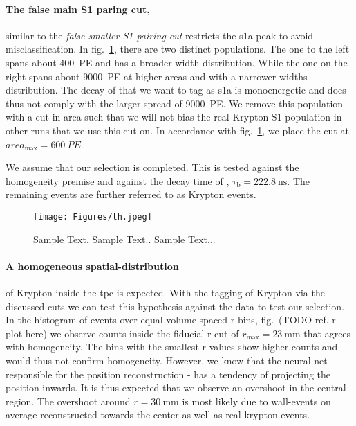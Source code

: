\paragraph{The false main S1 paring cut,} similar to the \emph{false smaller S1 pairing cut} restricts the \gls{s1a} peak to avoid misclassification.
In fig.~\ref{fig:main_s1_area_width}, there are two distinct populations.
The one to the left spans about \SI{400}{PE} and has a broader width distribution.
While the one on the right spans about \SI{9000}{PE} at higher areas and with a narrower widths distribution.
The decay of  that we want to tag as \gls{s1a} is monoenergetic and does thus not comply with the larger spread of \SI{9000}{PE}.
We remove this population with a cut in area such that we will not bias the real Krypton S1 population in other runs that we use this cut on.
In accordance with fig.~\ref{fig:main_s1_area_width}, we place the cut at $ area_\mathrm{max} = \SI{600}{PE}$.

We assume that our selection is completed.
This is tested against the homogeneity premise and against the decay time of , $\tau_\mathrm{b} = \SI{222.8}{\nano\s}$.
The remaining events are further referred to as Krypton events.


\begin{figure}
\centering
\texttt{[image: Figures/th.jpeg]}  %
\caption[Area-Width Histogram of main S1 after Fid. Cut]{
        Sample Text.
        Sample Text..
        Sample Text...
    }
\label{fig:main_s1_area_width}
\end{figure}


\paragraph{A homogeneous spatial-distribution} of Krypton inside the \gls{tpc} is expected.
With the tagging of Krypton via the discussed cuts we can test this hypothesis against the data to test our selection.
In the histogram of events over equal volume spaced r-bins, fig.~(TODO ref. r plot here) we observe counts inside the fiducial r-cut of $r_\mathrm{max} = \SI{23}{\milli\m}$ that agrees with homogeneity.
The bins with the smallest r-values show higher counts and would thus not confirm homogeneity.
However, we know that the neural net - responsible for the position reconstruction - has a tendency of projecting the position inwards. %
It is thus expected that we observe an overshoot in the central region.
The overshoot around $ r = \SI{30}{\milli\m} $ is most likely due to wall-events on average reconstructed towards the center as well as real krypton events.

